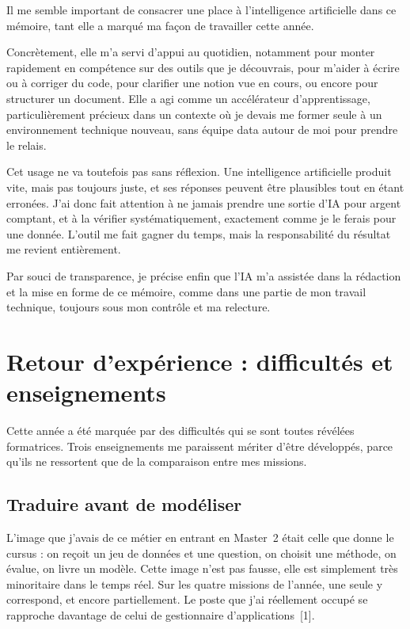 Il me semble important de consacrer une place à l'intelligence artificielle dans ce mémoire,
tant elle a marqué ma façon de travailler cette année.

Concrètement, elle m'a servi d'appui au quotidien, notamment pour monter rapidement en
compétence sur des outils que je découvrais, pour m'aider à écrire ou à corriger du code, pour
clarifier une notion vue en cours, ou encore pour structurer un document. Elle a agi comme un
accélérateur d'apprentissage, particulièrement précieux dans un contexte où je devais me former
seule à un environnement technique nouveau, sans équipe data autour de moi pour prendre le
relais.

Cet usage ne va toutefois pas sans réflexion. Une intelligence artificielle produit vite, mais
pas toujours juste, et ses réponses peuvent être plausibles tout en étant erronées. J'ai donc
fait attention à ne jamais prendre une sortie d'IA pour argent comptant, et à la vérifier
systématiquement, exactement comme je le ferais pour une donnée. L'outil me fait gagner du
temps, mais la responsabilité du résultat me revient entièrement.

Par souci de transparence, je précise enfin que l'IA m'a assistée dans la rédaction et la mise
en forme de ce mémoire, comme dans une partie de mon travail technique, toujours sous mon
contrôle et ma relecture.

\section{Retour d'expérience : difficultés et enseignements}

Cette année a été marquée par des difficultés qui se sont toutes révélées formatrices. Trois
enseignements me paraissent mériter d'être développés, parce qu'ils ne ressortent que de la
comparaison entre mes missions.

\subsection{Traduire avant de modéliser}

L'image que j'avais de ce métier en entrant en Master~2 était celle que donne le cursus : on
reçoit un jeu de données et une question, on choisit une méthode, on évalue, on livre un modèle.
Cette image n'est pas fausse, elle est simplement très minoritaire dans le temps réel. Sur les
quatre missions de l'année, une seule y correspond, et encore partiellement. Le poste que j'ai
réellement occupé se rapproche davantage de celui de gestionnaire d'applications~[1].

